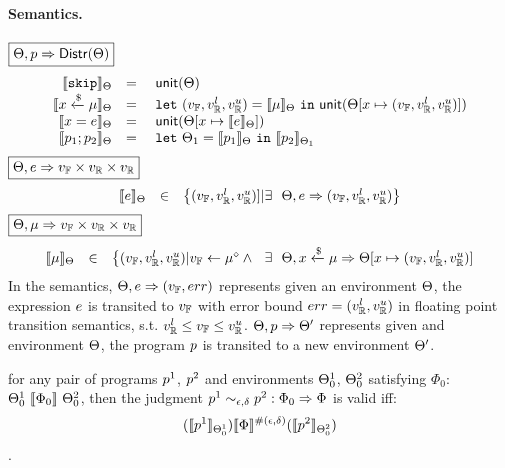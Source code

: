 \documentclass[a4paper,11pt]{article}
\begin{document}
\newpage
\paragraph{Semantics.}
$\boxed{\Theta, p \Rightarrow \mathsf{Distr}(\Theta)}$
\[
	\begin{array}{rcl}
	\llbracket \mathtt{skip} \rrbracket_{\Theta}
	& = & 
	~\mathsf{unit}(\Theta)
	\\
	\llbracket x \xleftarrow{\$} \mu \rrbracket_{\Theta}
	& = & 
	~\mathtt{let}~ (v_{\mathbb{F}}, v_{\mathbb{R}}^{l}, v_{\mathbb{R}}^{u}) = \llbracket \mu \rrbracket_{\Theta} 
	~\mathtt{in}~ 
	\mathsf{unit}(\Theta[x \mapsto (v_{\mathbb{F}}, v_{\mathbb{R}}^{l}, v_{\mathbb{R}}^{u})])
	\\
	\llbracket x = e \rrbracket_{\Theta}
	& = &  
	~\mathsf{unit}(\Theta[x \mapsto \llbracket e \rrbracket_{\Theta}])
	\\
	\llbracket p_1; p_2 \rrbracket_{\Theta}
	& = &  ~\mathtt{let}~  \Theta_1 = 
	\llbracket p_1 \rrbracket_{\Theta} ~\mathtt{in}~
	\llbracket p_2 \rrbracket_{\Theta_1} 
	\end{array}
\]
$\boxed{\Theta, e \Rightarrow v_{\mathbb{F}} \times v_{\mathbb{R}} \times v_{\mathbb{R}}}$
\[
	\begin{array}{rcl}
	\llbracket e \rrbracket_{\Theta}
	& \in &  
	\big\{(v_{\mathbb{F}}, v_{\mathbb{R}}^{l}, v_{\mathbb{R}}^{u})] |
	\exists ~~  
	\Theta,  
	e \Rightarrow (v_{\mathbb{F}}, v_{\mathbb{R}}^{l}, v_{\mathbb{R}}^{u})\big\}
	\end{array}
\]
$
\boxed{\Theta, \mu \Rightarrow v_{\mathbb{F}} \times v_{\mathbb{R}} \times v_{\mathbb{R}}}
$
\[
	\begin{array}{rcl}
	\llbracket \mu \rrbracket_{\Theta}
	& \in & 
	\big\{
	(v_{\mathbb{F}}, v_{\mathbb{R}}^{l}, v_{\mathbb{R}}^{u}) |
	v_{\mathbb{F}} \leftarrow \mu^{\diamond}
	\land
	~~ \exists ~~  
	\Theta, x \xleftarrow{\$} \mu \Rightarrow \Theta[x \mapsto (v_{\mathbb{F}}, v_{\mathbb{R}}^{l}, v_{\mathbb{R}}^{u})]
	\end{array}
\]
In the semantics, 
$\Theta, e \Rightarrow (v_{\mathbb{F}}, err)$ represents given an environment $\Theta$, the expression $e$
is transited to $v_{\mathbb{F}}$ with error bound $err = (v_{\mathbb{R}}^{l}, v_{\mathbb{R}}^{u})$ in floating point transition semantics, s.t. $v_{\mathbb{R}}^{l} \leq v_{\mathbb{F}} \leq v_{\mathbb{R}}^{u}$. 
$\Theta, p \Rightarrow \Theta'$ represents given and environment $\Theta$, the program $p$ is transited to a new environment $\Theta'$.


\clearpage
\begin{thm}[Soundness]
for any pair of programs $p^1$, $p^2$ and environments $\Theta^1_0$, $\Theta^2_0$ 
satisfying $\Phi_0$: 
$\Theta^1_0 ~ \llbracket \Phi_0 \rrbracket ~ \Theta^2_0$, then the judgment  
$p^1	
\sim_{\epsilon, \delta} 
p^2 :
\Phi_0 \Rightarrow \Phi $ 
is valid iff: 
$$ 
(\llbracket p^1 \rrbracket_{\Theta^1_0})  
\llbracket \Phi \rrbracket^{\#(\epsilon, \delta)} 
(\llbracket p^2 \rrbracket_{\Theta^2_0}) 
$$.
\end{thm}
\end{document}
